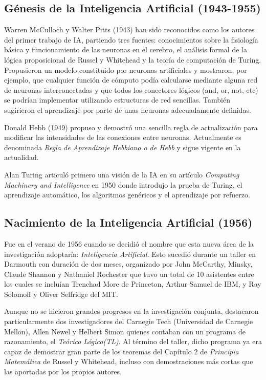\documentclass[12pt,a4paper]{article}
\begin{document}
\subsection{Génesis de la Inteligencia Artificial (1943-1955)}
Warren McCulloch y Walter Pitts (1943) han sido reconocidos como los autores del primer trabajo de IA, partiendo tres fuentes: conocimientos sobre la fisiología básica y funcionamiento de las neuronas en el cerebro, el análisis formal de la lógica proposicional de Russel y Whitehead y la teoría de computación de Turing. Propusieron un modelo constituido por neuronas artificiales y mostraron, por ejemplo, que cualquier función de cómputo podía calcularse mediante alguna red de neuronas interconectadas y que todos los conectores lógicos (and, or, not, etc) se podrían implementar utilizando estructuras de red sencillas. También sugirieron el aprendizaje por parte de unas neuronas adecuadamente definidas.

Donald Hebb (1949) propuso y demostró una sencilla regla de actualización para modificar las intensidades de las conexiones entre neuronas. Actualmente es denominada \emph{Regla de Aprendizaje Hebbiano o de Hebb} y sigue vigente en la actualidad.

Alan Turing articuló primero una visión de la IA en su artículo \emph{Computing Machinery and Intelligence}\cite{Turing} en 1950 donde introdujo la prueba de Turing, el aprendizaje automático, los algoritmos genéricos y el aprendizaje por refuerzo.

\subsection{Nacimiento de la Inteligencia Artificial (1956)}
Fue en el verano de 1956 cuando se decidió el nombre que esta nueva área de la investigación adoptaría: \emph{Inteligencia Artificial}. Esto sucedió durante un taller en Darmouth con duración de dos meses, organizado por John McCarthy, Minsky, Claude Shannon y Nathaniel Rochester que tuvo un total de 10 asistentes entre los cuales se incluían Trenchad More de Princeton, Arthur Samuel de IBM, y Ray Solomoff y Oliver Selfridge del MIT.

Aunque no se hicieron grandes progresos en la investigación conjunta, destacaron particularmente dos investigadores del Carnegie Tech (Universidad de Carnegie Mellon), Allen Newel y Helbert Simon quienes contaban con un programa de razonamiento, el \emph{Teórico Lógico(TL)}. Al término del taller, dicho programa ya era capaz de demostrar gran parte de los teoremas del Capítulo 2 de \emph{Principia Matemática} de Russel y Whitehead, incluso con demostraciones más cortas que las aportadas por los propios autores.
\end{document}
